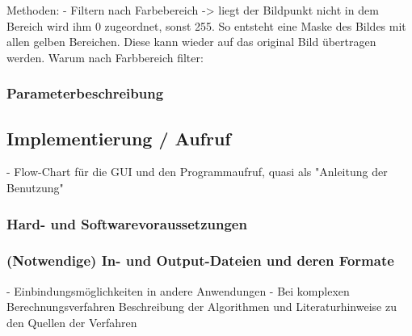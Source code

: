 Methoden: 
- Filtern nach Farbebereich -> liegt der Bildpunkt nicht in dem Bereich wird ihm 0 zugeordnet, sonst 255. So entsteht eine Maske des Bildes mit allen gelben Bereichen.
Diese kann wieder auf das original Bild übertragen werden. 
Warum nach Farbbereich filter:

\subsubsection{Parameterbeschreibung}


\subsection{Implementierung / Aufruf}    
- Flow-Chart für die GUI und den Programmaufruf, quasi als "Anleitung der Benutzung"
\subsubsection{Hard- und Softwarevoraussetzungen}
\subsubsection{(Notwendige) In- und Output-Dateien und deren Formate}



- Einbindungsmöglichkeiten in andere Anwendungen
- Bei komplexen Berechnungsverfahren Beschreibung der Algorithmen und Literaturhinweise zu den Quellen der Verfahren


    

